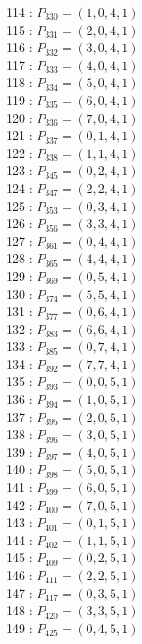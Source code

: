 \documentclass{article}
\begin{document}
{\begin{multicols}{3}
114 : $P_{330}=( 1, 0, 4, 1 )$\\
115 : $P_{331}=( 2, 0, 4, 1 )$\\
116 : $P_{332}=( 3, 0, 4, 1 )$\\
117 : $P_{333}=( 4, 0, 4, 1 )$\\
118 : $P_{334}=( 5, 0, 4, 1 )$\\
119 : $P_{335}=( 6, 0, 4, 1 )$\\
120 : $P_{336}=( 7, 0, 4, 1 )$\\
121 : $P_{337}=( 0, 1, 4, 1 )$\\
122 : $P_{338}=( 1, 1, 4, 1 )$\\
123 : $P_{345}=( 0, 2, 4, 1 )$\\
124 : $P_{347}=( 2, 2, 4, 1 )$\\
125 : $P_{353}=( 0, 3, 4, 1 )$\\
126 : $P_{356}=( 3, 3, 4, 1 )$\\
127 : $P_{361}=( 0, 4, 4, 1 )$\\
128 : $P_{365}=( 4, 4, 4, 1 )$\\
129 : $P_{369}=( 0, 5, 4, 1 )$\\
130 : $P_{374}=( 5, 5, 4, 1 )$\\
131 : $P_{377}=( 0, 6, 4, 1 )$\\
132 : $P_{383}=( 6, 6, 4, 1 )$\\
133 : $P_{385}=( 0, 7, 4, 1 )$\\
134 : $P_{392}=( 7, 7, 4, 1 )$\\
135 : $P_{393}=( 0, 0, 5, 1 )$\\
136 : $P_{394}=( 1, 0, 5, 1 )$\\
137 : $P_{395}=( 2, 0, 5, 1 )$\\
138 : $P_{396}=( 3, 0, 5, 1 )$\\
139 : $P_{397}=( 4, 0, 5, 1 )$\\
140 : $P_{398}=( 5, 0, 5, 1 )$\\
141 : $P_{399}=( 6, 0, 5, 1 )$\\
142 : $P_{400}=( 7, 0, 5, 1 )$\\
143 : $P_{401}=( 0, 1, 5, 1 )$\\
144 : $P_{402}=( 1, 1, 5, 1 )$\\
145 : $P_{409}=( 0, 2, 5, 1 )$\\
146 : $P_{411}=( 2, 2, 5, 1 )$\\
147 : $P_{417}=( 0, 3, 5, 1 )$\\
148 : $P_{420}=( 3, 3, 5, 1 )$\\
149 : $P_{425}=( 0, 4, 5, 1 )$\\

\end{multicols}}
\end{document}
